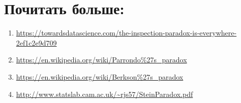 \documentclass[12pt]{article}
\begin{document}
\section*{Почитать больше:}

\begin{enumerate}
    \item \url{https://towardsdatascience.com/the-inspection-paradox-is-everywhere-2ef1c2e9d709} 
    \item \url{https://en.wikipedia.org/wiki/Parrondo%27s_paradox}
    \item \url{https://en.wikipedia.org/wiki/Berkson%27s_paradox}
    \item \url{http://www.statslab.cam.ac.uk/~rjs57/SteinParadox.pdf}
\end{enumerate}
\end{document}
